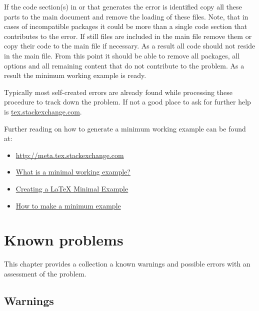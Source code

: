 If the code section(s) in  or  that generates the error is identified copy all these parts to the main document and remove the loading of these files. Note, that in cases of incompatible packages it could be more than a single code section that contributes to the error. If still files are included in the main file remove them or copy their code to the main file if necessary. As a result all code should not reside in the main file. From this point it should be able to remove all packages, all options and all remaining content that do not contribute to the problem. As a result the minimum working example is ready.

Typically most self-created errors are already found while processing these procedure to track down the problem. If not a good place to ask for further help is \href{http://tex.stackexchange.com}{tex.stackexchange.com}.

Further reading on how to generate a minimum working example can be found at:
\begin{itemize}
\item \href{http://meta.tex.stackexchange.com/questions/228/ive-just-been-asked-to-write-a-minimal-example-what-is-that}{http://meta.tex.stackexchange.com}
%
\item \href{http://www.faulhammer.org/mini-en.pdf}{What is a minimal working example?}
%
\item \href{http://theoval.cmp.uea.ac.uk/~nlct/latex/minexample/minexample.pdf}{Creating a LaTeX Minimal Example}
%
\item \href{http://www.tex.ac.uk/cgi-bin/texfaq2html?label=minxampl}{How to make a minimum example}
\end{itemize}

\chapter{Known problems}
\label{chap:doc:problems}

This chapter provides a collection a known warnings and possible errors with an assessment of the problem.

\section{Warnings}

